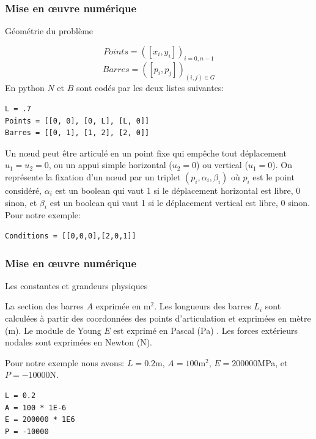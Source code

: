\documentclass{beamer}
\begin{document}
\begin{frame}[fragile]
\frametitle{Mise en œuvre numérique}

{\large Géométrie du problème}

\[Points=\left([x_i,y_i]\right)_{i=0,n-1}\]
\[Barres=\left([p_i,p_j]\right)_{(i,j)\in G}\]
 En python $N$ et $B$ sont codés par les deux listes suivantes:
\begin{verbatim}
L = .7
Points = [[0, 0], [0, L], [L, 0]]
Barres = [[0, 1], [1, 2], [2, 0]]
\end{verbatim}
Un nœud peut être articulé en un point fixe qui empêche tout déplacement  $u_1=u_2=0$, ou un appui simple horizontal ($u_2=0$) ou vertical ($u_1=0$). On représente la fixation d'un nœud par un triplet $\left(p_i,\alpha_i,\beta_i\right)$ où $p_i$ est le point considéré, $\alpha_i$ est un boolean qui vaut 1 si le déplacement horizontal est libre, 0 sinon, et $\beta_i$ est un boolean qui vaut 1 si le déplacement vertical est libre, 0 sinon. Pour notre exemple:
\begin{verbatim}
Conditions = [[0,0,0],[2,0,1]]
\end{verbatim}
\end{frame}

\begin{frame}[fragile]
\frametitle{Mise en œuvre numérique}
{\Large Les constantes et grandeurs physiques}

La section des barres $A$ exprimée en $\mbox{m}^2$. Les longueurs des barres $L_i$ sont calculées à partir des coordonnées des points d'articulation et exprimées en mètre (m). Le module de Young $E$ est exprimé en Pascal (Pa) . Les forces extérieurs nodales sont exprimées en Newton (N).

Pour notre exemple nous avons:
$L=0.2$m, $A=100\mbox{m}^2$, $E=200000$MPa, et $P=-10000$N.
\begin{verbatim}
L = 0.2
A = 100 * 1E-6
E = 200000 * 1E6
P = -10000
\end{verbatim}
\end{frame}
\end{document}
